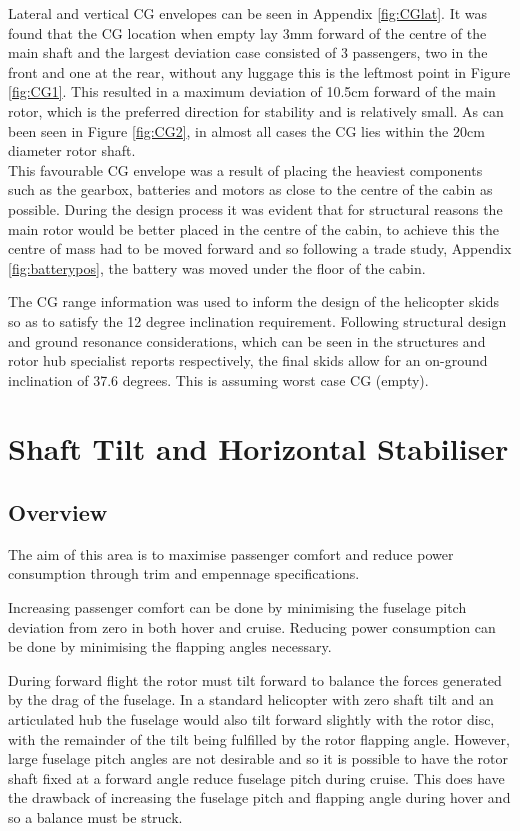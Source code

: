 \documentclass[11pt,a4paper]{article}
\begin{document}
Lateral and vertical CG envelopes can be seen in Appendix \ref{fig:CGlat}.
It was found that the CG location when empty lay 3mm forward of the centre of the main shaft and the largest deviation case consisted of 3 passengers, two in the front and one at the rear, without any luggage this is the leftmost point in Figure \ref{fig:CG1}. This resulted in a maximum deviation of 10.5cm forward of the main rotor, which is the preferred direction for stability \cite{prouty} and is relatively small. As can been seen in Figure \ref{fig:CG2}, in almost all cases the CG lies within the 20cm diameter rotor shaft.\\ This favourable CG envelope was a result of placing the heaviest components such as the gearbox, batteries and motors as close to the centre of the cabin as possible. During the design process it was evident that for structural reasons the main rotor would be better placed in the centre of the cabin, to achieve this the centre of mass had to be moved forward and so following a trade study, Appendix \ref{fig:batterypos}, the battery was moved under the floor of the cabin.

The CG range information was used to inform the design of the helicopter skids so as to satisfy the 12 degree inclination requirement. Following structural design and ground resonance considerations, which can be seen in the structures and rotor hub specialist reports respectively, the final skids allow for an on-ground inclination of 37.6 degrees. This is assuming worst case CG (empty).\\

\section{Shaft Tilt and Horizontal Stabiliser}

\subsection{Overview}
The aim of this area is to maximise passenger comfort and reduce power consumption through trim and empennage specifications.

Increasing passenger comfort can be done by minimising the fuselage pitch deviation from zero in both hover and cruise. Reducing power consumption can be done by minimising the flapping angles necessary.

During forward flight the rotor must tilt forward to balance the forces generated by the drag of the fuselage.
In a standard helicopter with zero shaft tilt and an articulated hub the fuselage would also tilt forward slightly with the rotor disc, with the remainder of the tilt being fulfilled by the rotor flapping angle. 
However, large fuselage pitch angles are not desirable and so it is possible to have the rotor shaft fixed at a forward angle reduce fuselage pitch during cruise. This does have the drawback of increasing the fuselage pitch and flapping angle during hover and so a balance must be struck.
\end{document}
